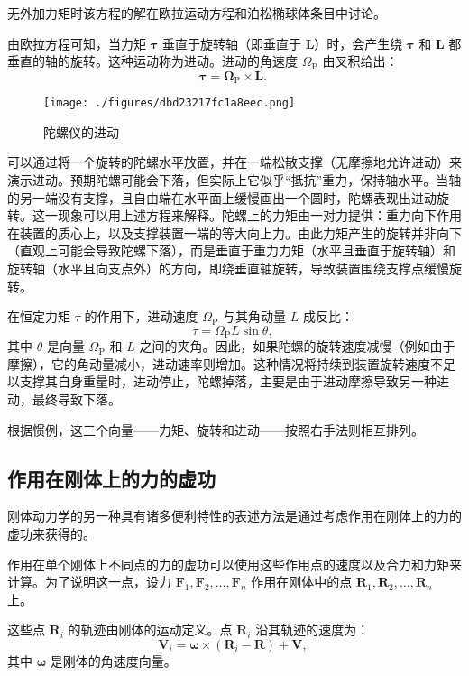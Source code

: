 无外加力矩时该方程的解在欧拉运动方程和泊松椭球体条目中讨论。

由欧拉方程可知，当力矩 \(\boldsymbol{\tau}\) 垂直于旋转轴（即垂直于 \(\mathbf{L}\)）时，会产生绕 \(\boldsymbol{\tau}\) 和 \(\mathbf{L}\) 都垂直的轴的旋转。这种运动称为进动。进动的角速度 \(\Omega_{\mathrm{P}}\) 由叉积给出：
\[
\boldsymbol{\tau} = \boldsymbol{\Omega}_{\mathrm{P}} \times \mathbf{L}.~
\]
\begin{figure}[ht]
\centering
\texttt{[image: ./figures/dbd23217fc1a8eec.png]}
\caption{陀螺仪的进动} \label{fig_GTDL_6}
\end{figure}
可以通过将一个旋转的陀螺水平放置，并在一端松散支撑（无摩擦地允许进动）来演示进动。预期陀螺可能会下落，但实际上它似乎“抵抗”重力，保持轴水平。当轴的另一端没有支撑，且自由端在水平面上缓慢画出一个圆时，陀螺表现出进动旋转。这一现象可以用上述方程来解释。陀螺上的力矩由一对力提供：重力向下作用在装置的质心上，以及支撑装置一端的等大向上力。由此力矩产生的旋转并非向下（直观上可能会导致陀螺下落），而是垂直于重力力矩（水平且垂直于旋转轴）和旋转轴（水平且向支点外）的方向，即绕垂直轴旋转，导致装置围绕支撑点缓慢旋转。

在恒定力矩 \(\tau\) 的作用下，进动速度 \(\Omega_{\mathrm{P}}\) 与其角动量 \(L\) 成反比：
\[
\tau = \Omega_{\mathrm{P}} L \sin \theta,~
\]
其中 \(\theta\) 是向量 \(\Omega_{\mathrm{P}}\) 和 \(L\) 之间的夹角。因此，如果陀螺的旋转速度减慢（例如由于摩擦），它的角动量减小，进动速率则增加。这种情况将持续到装置旋转速度不足以支撑其自身重量时，进动停止，陀螺掉落，主要是由于进动摩擦导致另一种进动，最终导致下落。

根据惯例，这三个向量——力矩、旋转和进动——按照右手法则相互排列。
\subsection{作用在刚体上的力的虚功}
刚体动力学的另一种具有诸多便利特性的表述方法是通过考虑作用在刚体上的力的虚功来获得的。

作用在单个刚体上不同点的力的虚功可以使用这些作用点的速度以及合力和力矩来计算。为了说明这一点，设力 \( \mathbf{F}_1, \mathbf{F}_2, \dots, \mathbf{F}_n \) 作用在刚体中的点 \( \mathbf{R}_1, \mathbf{R}_2, \dots, \mathbf{R}_n \) 上。

这些点 \( \mathbf{R}_i \) 的轨迹由刚体的运动定义。点 \( \mathbf{R}_i \) 沿其轨迹的速度为：
\[
\mathbf{V}_i = \boldsymbol{\omega} \times (\mathbf{R}_i - \mathbf{R}) + \mathbf{V},~
\]
其中 \( \boldsymbol{\omega} \) 是刚体的角速度向量。